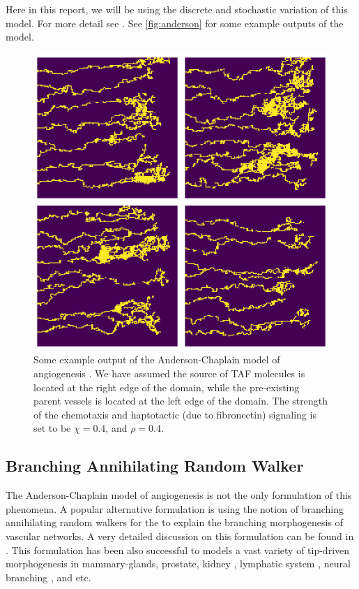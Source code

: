 \documentclass[10pt,a4paper,twocolumn]{article}
\begin{document}
	Here in this report, we will be using the discrete and stochastic variation of this model. For more detail see \cite{Anderson1998}. See \autoref{fig:anderson} for some example outputs of the model.
	\begin{figure}[h!]
		\centering
		\includegraphics[width=1\linewidth]{images/Anderson}
		\caption{Some example output of the Anderson-Chaplain model of angiogenesis . We have assumed the source of TAF molecules is located at the right edge of the domain, while the pre-existing parent vessels is located at the left edge of the domain. The strength of the chemotaxis and haptotactic (due to fibronectin) signaling is set to be $ \chi = 0.4 $, and $ \rho = 0.4 $.}
		\label{fig:anderson}
	\end{figure}
	
	\subsection{Branching Annihilating Random Walker}
	The Anderson-Chaplain model of angiogenesis is not the only formulation of this phenomena. A popular alternative formulation is using the notion of branching annihilating random walkers for the to explain the branching morphogenesis of vascular networks. A very detailed discussion on this formulation can be found in \cite{Hannezo2017,Ucar2021}. This formulation has been also successful to models a vast variety of tip-driven morphogenesis in mammary-glands, prostate, kidney \cite{Hannezo2017}, lymphatic system \cite{Ucar2023}, neural branching \cite{Ucar2021}, and etc.
	
\end{document}
